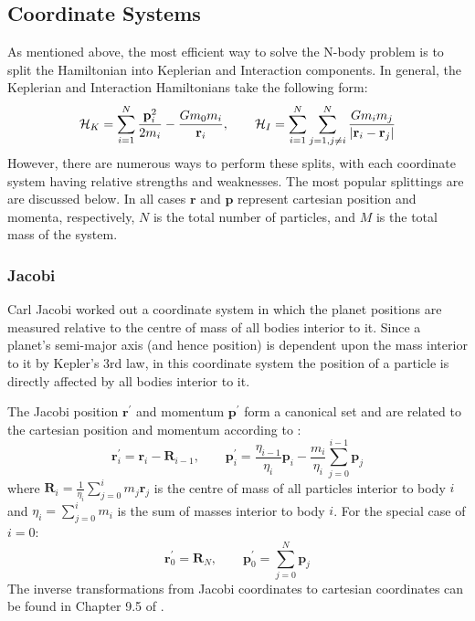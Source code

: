 \subsection{Coordinate Systems}
As mentioned above, the most efficient way to solve the N-body  problem is to split the Hamiltonian into Keplerian and Interaction components.
In general, the Keplerian and Interaction Hamiltonians take the following form:
\begin{equation}
\mathcal{H}_K = \sum_{i=1}^N \frac{\textbf{p}_i^2}{2m_i} - \frac{Gm_0m_i}{\textbf{r}_i}, \qquad
\mathcal{H}_I = \sum_{i=1}^{N}\sum_{j=1,j \ne i}^N \frac{Gm_im_j}{|\textbf{r}_i - \textbf{r}_j|}
\label{eq:Hgeneral}
\end{equation}
However, there are numerous ways to perform these splits, with each coordinate system having relative strengths and weaknesses. 
The most popular splittings are are discussed below. 
In all cases $\textbf{r}$ and $\textbf{p}$ represent cartesian position and momenta, respectively, $N$ is the total number of particles, and $M$ is the total mass of the system. 

\subsubsection{Jacobi}
\label{sec:Jacobi}
Carl Jacobi worked out a coordinate system in which the planet positions are measured relative to the centre of mass of all bodies interior to it. 
Since a planet's semi-major axis (and hence position) is dependent upon the mass interior to it by Kepler's 3rd law, in this coordinate system the position of a particle is directly affected by all bodies interior to it. 

The Jacobi position $\textbf{r}^{\prime}$ and momentum $\textbf{p}^{\prime}$ form a canonical set and are related to the cartesian position and momentum according to \citep{SSD1999}:
\begin{equation}
\textbf{r}^{\prime}_i = \textbf{r}_i - \textbf{R}_{i-1}, \qquad
\textbf{p}^{\prime}_i = \frac{\eta_{i-1}}{\eta_i}\textbf{p}_i - \frac{m_i}{\eta_i}\sum_{j=0}^{i-1} \textbf{p}_j
\end{equation}
where $\textbf{R}_i = \frac{1}{\eta_i} \sum_{j=0}^i m_j\textbf{r}_j$ is the centre of mass of all particles interior to body $i$ and $\eta_i = \sum_{j=0}^i m_i$ is the sum of masses interior to body $i$.
For the special case of $i=0$:
\begin{equation}
\textbf{r}^{\prime}_0 = \textbf{R}_{N}, \qquad
\textbf{p}^{\prime}_0 = \sum_{j=0}^{N} \textbf{p}_j
\end{equation}
The inverse transformations from Jacobi coordinates to cartesian coordinates can be found in Chapter 9.5 of \citet{SSD1999}.

